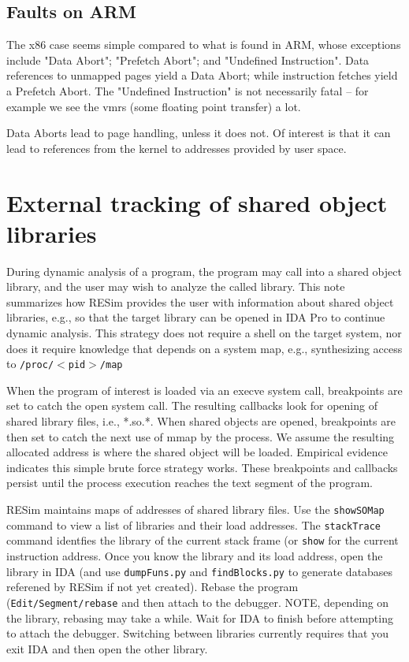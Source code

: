 \documentclass[titlepage]{article}
\begin{document}
\begin{appendices}
\subsection{Faults on ARM}
The x86 case seems simple compared to what is found in ARM, whose exceptions include "Data Abort"; "Prefetch Abort"; and "Undefined Instruction".  
Data references to unmapped pages yield a Data Abort; while instruction fetches yield a Prefetch Abort.  The "Undefined Instruction" is not necessarily fatal --
for example we see the vmrs (some floating point transfer) a lot.

Data Aborts lead to page handling, unless it does not.  Of interest is that it can lead to references from the kernel to addresses provided by user space.

\section{External tracking of shared object libraries}
\label{shared-libraries}
During dynamic analysis of a program, the program may call into a shared object library, and the user may wish to analyze the called library.  This note summarizes how RESim provides the user with information about shared object libraries, e.g., so that the target library can be opened in IDA Pro to continue dynamic analysis.  This strategy does not require a shell on the target system, nor does it require knowledge that depends on a system map, e.g., 
synthesizing access to {\tt /proc/$<$pid$>$/map}

When the program of interest is loaded via an execve system call, breakpoints are set to catch the open system call.  The resulting callbacks look for opening of shared library files, i.e., *.so.*.   When shared objects are opened, breakpoints are then set to catch the next use of mmap by the process.  We assume the resulting allocated address is where the shared object will be loaded.  Empirical evidence indicates this simple brute force strategy works.  These breakpoints and callbacks persist until the process execution reaches the text segment of the program.

RESim maintains maps of addresses of shared library files.  Use the {\tt showSOMap} command to view a list of libraries and their load
addresses.  The {\tt stackTrace} command identfies the library of the current stack frame (or {\tt show} for the current instruction address.
Once you know the library and its load address, open the library in IDA (and use {\tt dumpFuns.py} and {\tt findBlocks.py} to generate databases
referened by RESim if not yet created). Rebase the program ({\tt Edit/Segment/rebase} and then attach to the debugger. NOTE, depending on the library, rebasing may take a while.
Wait for IDA to finish before attempting to attach the debugger.
Switching between libraries currently requires that you exit IDA and then open the other library.


\end{appendices}
\end{document}
